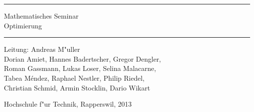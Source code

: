 \documentclass[a4paper]{book}
\begin{document}
\pagestyle{fancy}
\frontmatter
\newcommand\HRule{\noindent\rule{\linewidth}{1.5pt}}
\begin{titlepage}
\HRule
\vspace*{5pt}
\begin{flushright}
{
\LARGE
Mathematisches Seminar\\
\vspace*{20pt}
\Huge
Optimierung}
\end{flushright}
\HRule
\begin{flushright}
\vspace{60pt}
\Large
Leitung: Andreas M"uller\\
\vspace{40pt}
\Large
Dorian Amiet,
Hannes Badertscher,
Gregor Dengler,\\
Roman Gassmann,
Lukas Loser,
Selina Malacarne,\\
Tabea M\'endez,
Raphael Nestler,
Philip Riedel,\\
Christian Schmid,
Armin Stocklin,
Dario Wikart
\end{flushright}


\begin{center}
Hochschule f"ur Technik, Rapperswil, 2013
\end{center}
\end{titlepage}
\hypersetup{
    colorlinks=true,
    linktoc=all,
    linkcolor=blue
}
\newenvironment{beispiele}{
\bgroup\smallskip\parindent0pt\bf Beispiele\egroup

\begin{list}{\arabic{beispiel}.}
  {\usecounter{beispiel}
  \setlength{\labelsep}{5mm}
  \setlength{\rightmargin}{0pt}
}}{\end{list}}

\newenvironment{teilaufgaben}{
\begin{enumerate}
\renewcommand{\labelenumi}{\alph{enumi})}
}{\end{enumerate}}
\def\swallow#1{
}
\newenvironment{loesung}{%
\begin{proof}[L"osung]%
\renewcommand{\qedsymbol}{$\bigcirc$}
}{\end{proof}}
\def\keineloesungen{%
\renewenvironment{loesung}{\swallow\begingroup}{\endgroup}%
}

\newenvironment{beispiel}{%
\begin{proof}[Beispiel]%
\renewcommand{\qedsymbol}{$\bigcirc$}
}{\end{proof}}
\end{document}
